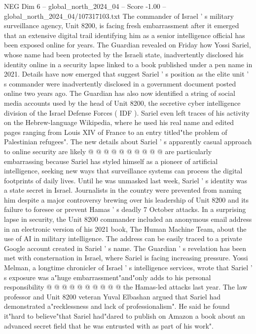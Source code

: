 \begin{textsample}{NEG Dim 6 – global\_north\_2024\_04 – Score -1.00 – global\_north\_2024\_04/107317103.txt}  \label{ex:f6_neg_367}
The commander of Israel ' s military surveillance agency, Unit 8200, is facing fresh embarrassment after it emerged that an extensive digital trail identifying him as a senior intelligence official has been exposed online for years.
The Guardian revealed on Friday how Yossi Sariel, whose name had been protected by the Israeli state, inadvertently disclosed his identity online in a security lapse linked to a book published under a pen name in 2021.
Details have now emerged that suggest Sariel ' s position as the elite unit ' s commander were inadvertently disclosed in a government document posted online two years ago.
The Guardian has also now identified a string of social media accounts used by the head of Unit 8200, the secretive cyber intelligence division of the Israel Defense Forces ( IDF ).
Sariel even left traces of his activity on the Hebrew-language Wikipedia, where he used his real name and edited pages ranging from Louis XIV of France to an entry titled"the problem of Palestinian refugees".
The new details about Sariel ' s apparently casual approach to online security are likely @ @ @ @ @ @ @ @ @ @ are particularly embarrassing because Sariel has styled himself as a pioneer of artificial intelligence, seeking new ways that surveillance systems can process the digital footprints of daily lives.
Until he was unmasked last week, Sariel ' s identity was a state secret in Israel.
Journalists in the country were prevented from naming him despite a major controversy brewing over his leadership of Unit 8200 and its failure to foresee or prevent Hamas ' s deadly 7 October attacks.
In a surprising lapse in security, the Unit 8200 commander included an anonymous email address in an electronic version of his 2021 book, The Human Machine Team, about the use of AI in military intelligence.
The address can be easily traced to a private Google account created in Sariel ' s name.
The Guardian ' s revelation has been met with consternation in Israel, where Sariel is facing increasing pressure.
Yossi Melman, a longtime chronicler of Israel ' s intelligence services, wrote that Sariel ' s exposure was a"huge embarrassment"and"only adds to his personal responsibility @ @ @ @ @ @ @ @ @ @ the Hamas-led attacks last year.
The law professor and Unit 8200 veteran Yuval Elbashan argued that Sariel had demonstrated a"recklessness and lack of professionalism".
He said he found it"hard to believe"that Sariel had"dared to publish on Amazon a book about an advanced secret field that he was entrusted with as part of his work".

\end{textsample}
